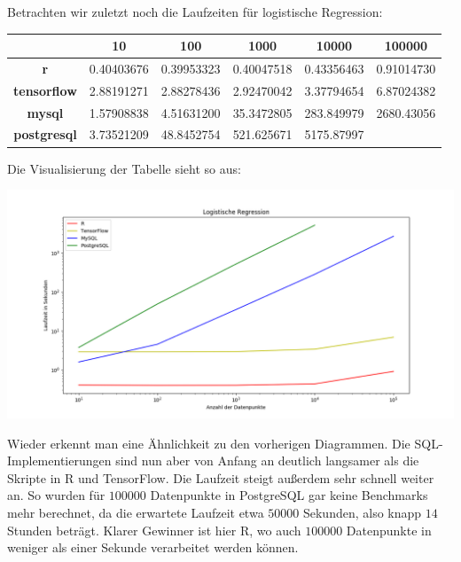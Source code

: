 Betrachten wir zuletzt noch die Laufzeiten für logistische Regression:

\begin{center}
  \begin{tabular}{|c|c|c|c|c|c|}\hline
    & \textbf{10} & \textbf{100} & \textbf{1000} & \textbf{10000} & \textbf{100000} \\ \hline
    \textbf{r} & 0.40403676 & 0.39953323 & 0.40047518 & 0.43356463 & 0.91014730 \\ \hline
    \textbf{tensorflow} & 2.88191271 & 2.88278436 & 2.92470042 & 3.37794654 & 6.87024382 \\ \hline
    \textbf{mysql} & 1.57908838 & 4.51631200 & 35.3472805 & 283.849979 & 2680.43056 \\ \hline
    \textbf{postgresql} & 3.73521209 & 48.8452754 & 521.625671 & 5175.87997 &  \\ \hline
  \end{tabular}
\end{center}

Die Visualisierung der Tabelle sieht so aus:

\includegraphics[width=\textwidth]{logisticRegressionBenchmark}

Wieder erkennt man eine Ähnlichkeit zu den vorherigen Diagrammen. Die SQL-Implementierungen sind nun aber von Anfang an deutlich langsamer als die Skripte in R und TensorFlow. Die Laufzeit steigt außerdem sehr schnell weiter an. So wurden für $100000$ Datenpunkte in PostgreSQL gar keine Benchmarks mehr berechnet, da die erwartete Laufzeit etwa $50000$ Sekunden, also knapp $14$ Stunden beträgt. Klarer Gewinner ist hier R, wo auch $100000$ Datenpunkte in weniger als einer Sekunde verarbeitet werden können.
